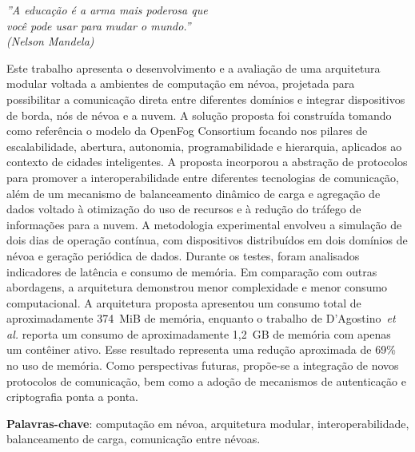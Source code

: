 \begin{epigrafe}
	\vspace*{\fill}
	\begin{flushright}
		\textit{''A educação é a arma mais poderosa que \\
            você pode usar para mudar o mundo.'' \\
            (Nelson Mandela)
            }
	\end{flushright}
\end{epigrafe}


\setlength{\absparsep}{18pt} %
\begin{resumo}
	\SingleSpacing
	Este trabalho apresenta o desenvolvimento e a avaliação de uma arquitetura modular voltada a ambientes de computação em névoa, projetada para possibilitar a comunicação direta entre diferentes domínios e integrar dispositivos de borda, nós de névoa e a nuvem. A solução proposta foi construída tomando como referência o modelo da OpenFog Consortium \cite{openfog2018} focando nos pilares de escalabilidade, abertura, autonomia, programabilidade e hierarquia, aplicados ao contexto de cidades inteligentes. A proposta incorporou a abstração de protocolos para promover a interoperabilidade entre diferentes tecnologias de comunicação, além de um mecanismo de balanceamento dinâmico de carga e agregação de dados voltado à otimização do uso de recursos e à redução do tráfego de informações para a nuvem. A metodologia experimental envolveu a simulação de dois dias de operação contínua, com dispositivos distribuídos em dois domínios de névoa e geração periódica de dados. Durante os testes, foram analisados indicadores de latência e consumo de memória. Em comparação com outras abordagens, a arquitetura demonstrou menor complexidade e menor consumo computacional. A arquitetura proposta apresentou um consumo total de aproximadamente 374~MiB de memória, enquanto o trabalho de D’Agostino~\textit{et al.} \cite{dagostino2025} reporta um consumo de aproximadamente 1,2~GB de memória com apenas um contêiner ativo. Esse resultado representa uma redução aproximada de 69\% no uso de memória. Como perspectivas futuras, propõe-se a integração de novos protocolos de comunicação, bem como a adoção de mecanismos de autenticação e criptografia ponta a ponta.
	
	\textbf{Palavras-chave}: computação em névoa, arquitetura modular, interoperabilidade, balanceamento de carga, comunicação entre névoas.
\end{resumo} 

